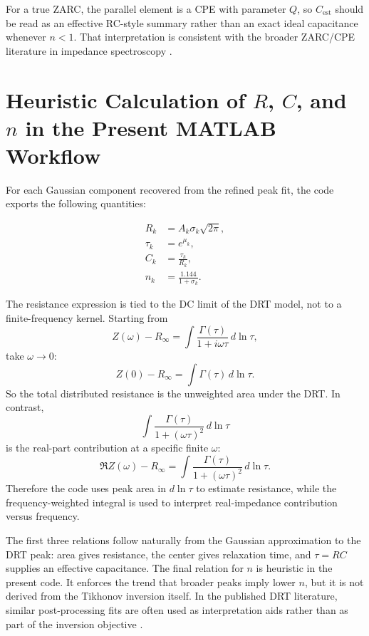 \documentclass[11pt]{article}
\begin{document}
For a true ZARC, the parallel element is a CPE with parameter $Q$, so $C_{\mathrm{est}}$ should be read as an effective RC-style summary rather than an exact ideal capacitance whenever $n < 1$. That interpretation is consistent with the broader ZARC/CPE literature in impedance spectroscopy \cite{cordoba2018,ivertiffee2017}.

\section{Heuristic Calculation of $R$, $C$, and $n$ in the Present MATLAB Workflow}

For each Gaussian component recovered from the refined peak fit, the code exports the following quantities:

\begin{align}
R_k &= A_k \sigma_k \sqrt{2\pi}, \\
\tau_k &= e^{\mu_k}, \\
C_k &= \frac{\tau_k}{R_k}, \\
n_k &= \frac{1.144}{1 + \sigma_k}.
\end{align}

The resistance expression is tied to the DC limit of the DRT model, not to a finite-frequency kernel. Starting from
\begin{equation}
Z(\omega)-R_\infty = \int \frac{\Gamma(\tau)}{1+i\omega\tau}\,d\ln\tau,
\end{equation}
take $\omega \to 0$:
\begin{equation}
Z(0)-R_\infty = \int \Gamma(\tau)\,d\ln\tau.
\end{equation}
So the total distributed resistance is the unweighted area under the DRT. In contrast,
\begin{equation}
\int \frac{\Gamma(\tau)}{1+(\omega\tau)^2}\,d\ln\tau
\end{equation}
is the real-part contribution at a specific finite $\omega$:
\begin{equation}
\Re Z(\omega)-R_\infty = \int \frac{\Gamma(\tau)}{1+(\omega\tau)^2}\,d\ln\tau.
\end{equation}
Therefore the code uses peak area in $d\ln\tau$ to estimate resistance, while the frequency-weighted integral is used to interpret real-impedance contribution versus frequency.

The first three relations follow naturally from the Gaussian approximation to the DRT peak: area gives resistance, the center gives relaxation time, and $\tau = RC$ supplies an effective capacitance. The final relation for $n$ is heuristic in the present code. It enforces the trend that broader peaks imply lower $n$, but it is not derived from the Tikhonov inversion itself. In the published DRT literature, similar post-processing fits are often used as interpretation aids rather than as part of the inversion objective \cite{danzer2019,schluter2019,maradesa2023}.
\end{document}
